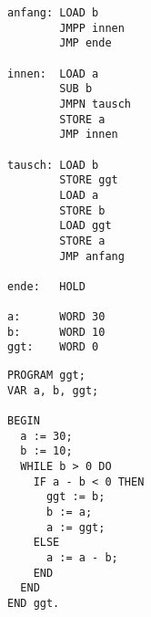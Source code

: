 \documentclass{lehramt-informatik-aufgabe}
\begin{document}
\begin{enumerate}
\begin{multicols}{2}
\begin{verbatim}
anfang: LOAD b
        JMPP innen
        JMP ende

innen:  LOAD a
        SUB b
        JMPN tausch
        STORE a
        JMP innen

tausch: LOAD b
        STORE ggt
        LOAD a
        STORE b
        LOAD ggt
        STORE a
        JMP anfang

ende:   HOLD

a:      WORD 30
b:      WORD 10
ggt:    WORD 0
\end{verbatim}

\liSpaltenUmbruch
{}

\begin{verbatim}
PROGRAM ggt;
VAR a, b, ggt;

BEGIN
  a := 30;
  b := 10;
  WHILE b > 0 DO
    IF a - b < 0 THEN
      ggt := b;
      b := a;
      a := ggt;
    ELSE
      a := a - b;
    END
  END
END ggt.
\end{verbatim}
\end{multicols}
\end{enumerate}
\end{document}
